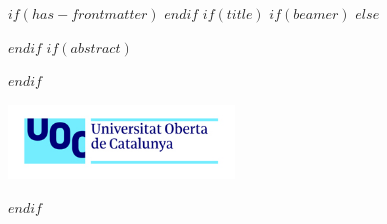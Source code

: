 $if(has-frontmatter)$
\frontmatter
$endif$
$if(title)$
$if(beamer)$
\frame{\titlepage}
$else$
\maketitle
$endif$
$if(abstract)$
\begin{abstract}
$abstract$
\end{abstract}
$endif$
\begin{center}
\includegraphics[width=6cm]{UOClogo.jpg}
\end{center}
\newpage
$endif$
